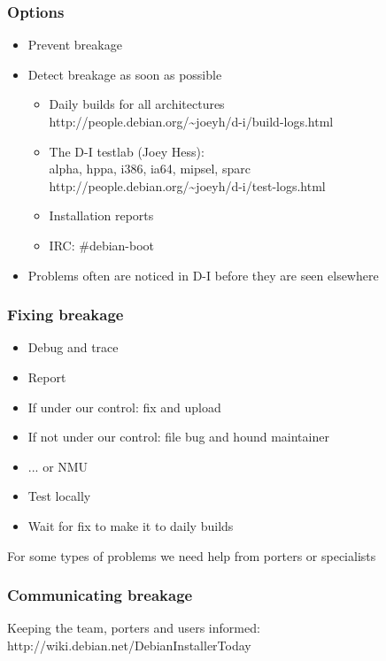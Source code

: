 \documentclass{beamer}
\begin{document}
\begin{frame}
  \frametitle{Options}
	\begin{itemize}[<+->]
	\item
		Prevent breakage
	\item
		Detect breakage as soon as possible
		\begin{itemize}
		\item
			Daily builds for all architectures \\
			http://people.debian.org/\~{}joeyh/d-i/build-logs.html
		\item
			The D-I testlab (Joey Hess): \\
			alpha, hppa, i386, ia64, mipsel, sparc \\
			http://people.debian.org/\~{}joeyh/d-i/test-logs.html
		\item
			Installation reports
		\item
			IRC: \#debian-boot
		\end{itemize}
	\item
		Problems often are noticed in D-I before they are seen elsewhere
	\end{itemize}
\end{frame}

\begin{frame}
  \frametitle{Fixing breakage}
	\begin{itemize}[<+->]
	\item
		Debug and trace
	\item
		Report
	\item
		If under our control: fix and upload
	\item
		If not under our control: file bug and hound maintainer
	\item
		... or NMU
	\item
		Test locally
	\item
		Wait for fix to make it to daily builds
	\end{itemize}

For some types of problems we need help from porters or specialists
\end{frame}

\begin{frame}
  \frametitle{Communicating breakage}
Keeping the team, porters and users informed: \\
http://wiki.debian.net/DebianInstallerToday
\end{frame}
\end{document}
